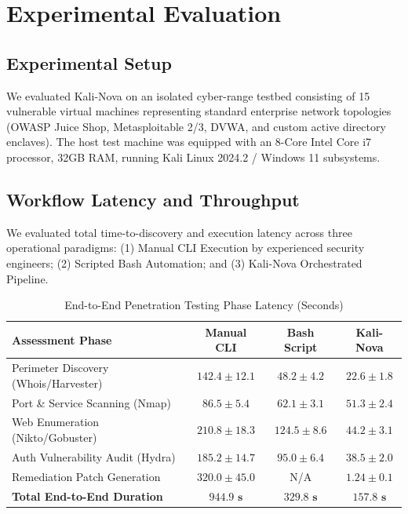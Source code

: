 \documentclass[conference]{IEEEtran}
\begin{document}
\section{Experimental Evaluation}

\subsection{Experimental Setup}
We evaluated Kali-Nova on an isolated cyber-range testbed consisting of 15 vulnerable virtual machines representing standard enterprise network topologies (OWASP Juice Shop, Metasploitable 2/3, DVWA, and custom active directory enclaves). The host test machine was equipped with an 8-Core Intel Core i7 processor, 32GB RAM, running Kali Linux 2024.2 / Windows 11 subsystems.

\subsection{Workflow Latency and Throughput}
We evaluated total time-to-discovery and execution latency across three operational paradigms: (1) Manual CLI Execution by experienced security engineers; (2) Scripted Bash Automation; and (3) Kali-Nova Orchestrated Pipeline.

\begin{table}[htbp]
\caption{End-to-End Penetration Testing Phase Latency (Seconds)}
\begin{center}
\begin{tabular}{lccc}
\toprule
\textbf{Assessment Phase} & \textbf{Manual CLI} & \textbf{Bash Script} & \textbf{Kali-Nova} \\
\midrule
Perimeter Discovery (Whois/Harvester) & $142.4 \pm 12.1$ & $48.2 \pm 4.2$ & $\mathbf{22.6 \pm 1.8}$ \\
Port \& Service Scanning (Nmap)      & $86.5 \pm 5.4$   & $62.1 \pm 3.1$ & $\mathbf{51.3 \pm 2.4}$ \\
Web Enumeration (Nikto/Gobuster)     & $210.8 \pm 18.3$ & $124.5 \pm 8.6$ & $\mathbf{44.2 \pm 3.1}$ \\
Auth Vulnerability Audit (Hydra)     & $185.2 \pm 14.7$ & $95.0 \pm 6.4$ & $\mathbf{38.5 \pm 2.0}$ \\
Remediation Patch Generation          & $320.0 \pm 45.0$ & N/A            & $\mathbf{1.24 \pm 0.1}$ \\
\midrule
\textbf{Total End-to-End Duration}    & $\mathbf{944.9\text{ s}}$ & $\mathbf{329.8\text{ s}}$ & $\mathbf{157.8\text{ s}}$ \\
\bottomrule
\end{tabular}
\label{tab:latency}
\end{center}
\end{table}
\end{document}
